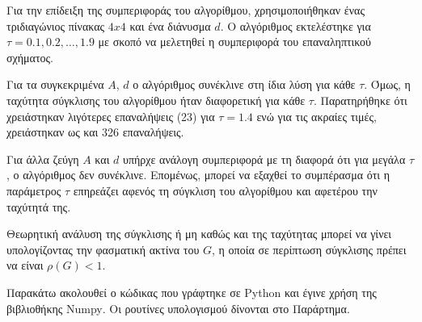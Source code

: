 \documentclass[assignment2.tex]{subfiles}
\begin{document}
Για την επίδειξη της συμπεριφοράς του αλγορίθμου, χρησιμοποιήθηκαν ένας τριδιαγώνιος πίνακας $4x4$ και ένα διάνυσμα $d$. Ο αλγόριθμος εκτελέστηκε για $\tau=0.1, 0.2, \dots, 1.9$ με σκοπό να μελετηθεί η συμπεριφορά του επαναληπτικού σχήματος.

Για τα συγκεκριμένα $A$, $d$ ο αλγόριθμος συνέκλινε στη ίδια λύση για κάθε $\tau$. Όμως, η ταχύτητα σύγκλισης του αλγορίθμου ήταν διαφορετική για κάθε $\tau$. Παρατηρήθηκε ότι χρειάστηκαν λιγότερες επαναλήψεις (23) για $\tau =1.4$ ενώ για τις ακραίες τιμές, χρειάστηκαν ως και 326 επαναλήψεις. 

Για άλλα ζεύγη $A$ και $d$ υπήρχε ανάλογη συμπεριφορά με τη διαφορά ότι για μεγάλα $\tau$, ο αλγόριθμος δεν συνέκλινε. Επομένως, μπορεί να εξαχθεί το συμπέρασμα ότι η παράμετρος $\tau$ επηρεάζει αφενός τη σύγκλιση του αλγορίθμου και αφετέρου την ταχύτητά της.

Θεωρητική ανάλυση της σύγκλισης ή μη καθώς και της ταχύτητας μπορεί να γίνει υπολογίζοντας την φασματική ακτίνα του $G$, η οποία σε περίπτωση σύγκλισης πρέπει να είναι $\rho(G)<1$.

Παρακάτω ακολουθεί ο κώδικας που γράφτηκε σε \textlatin{Python} και έγινε χρήση της βιβλιοθήκης \textlatin{Numpy}. Οι ρουτίνες υπολογισμού δίνονται στο Παράρτημα.

\end{document}
